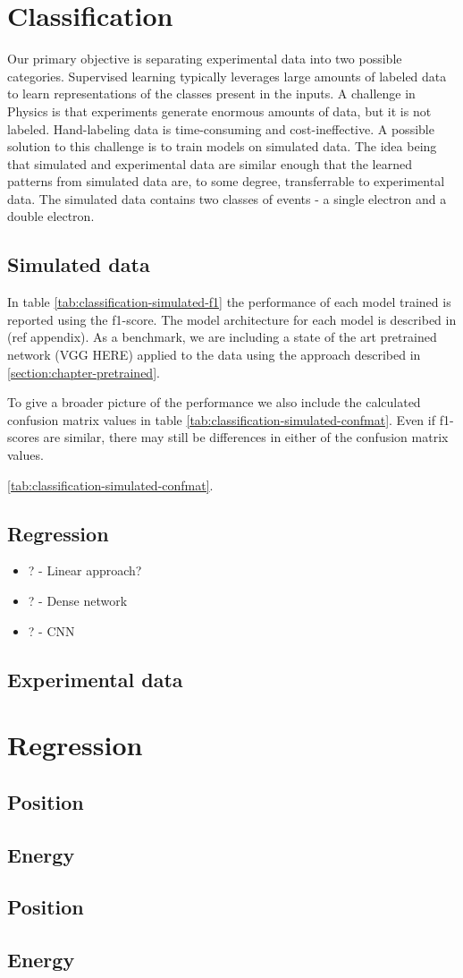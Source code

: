 \section{Classification}
Our primary objective is separating experimental data into two possible categories.
Supervised learning typically leverages large amounts of labeled data to learn
representations of the classes present in the inputs. A challenge in Physics is that
experiments generate enormous amounts of data, but it is not labeled. Hand-labeling
data is time-consuming and cost-ineffective. A possible solution to this challenge
is to train models on simulated data. The idea being that simulated and experimental
data are similar enough that the learned patterns from simulated data are, to some degree,
transferrable to experimental data.
The simulated data contains two classes of events - a single electron and a double electron.

\subsection{Simulated data}
In table \ref{tab:classification-simulated-f1} the performance of each model 
trained is reported using the f1-score. The model architecture for each model is described in (ref appendix).
As a benchmark, we are including a state of the art pretrained network (\cite{}VGG HERE) applied to the data 
using the approach described in \ref{section:chapter-pretrained}.

To give a broader picture of the performance we also include the calculated confusion matrix values in
table \ref{tab:classification-simulated-confmat}. Even if f1-scores are similar, there may still be differences
in either of the confusion matrix values.

\ref{tab:classification-simulated-confmat}.


\subsection{Regression}

\begin{itemize}
  \item ? - Linear approach?
  \item ? - Dense network
  \item ? - CNN
\end{itemize}
\subsection{Experimental data}
\section{Regression}
\subsection{Position}
\subsection{Energy}
\subsection{Position}
\subsection{Energy}
